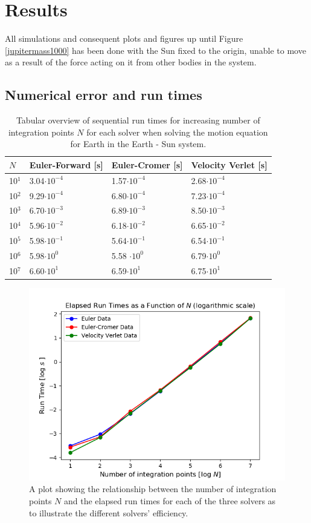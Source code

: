 \section{Results}
    All simulations and consequent plots and figures up until Figure \ref{jupitermass1000} has been done with the Sun fixed to the origin, unable to move as a result of the force acting on it from other bodies in the system.
\subsection{Numerical error and run times}
	\begin{table}[h!]
		\centering
		\caption{Tabular overview of sequential run times for increasing number of integration points $N$ for each solver when solving the motion equation for Earth in the Earth - Sun system.}
		\label{runtime}
		\begin{tabular}{l|l|l|l}
			$N$ & Euler-Forward [s] & Euler-Cromer [s] & Velocity Verlet [s]\\
			\hline
			10$^1$ &3.04$\cdot10^{-4}$ & 1.57$\cdot10^{-4}$ &2.68$\cdot10^{-4}$\\
			10$^2$ &9.29$\cdot10^{-4}$ & 6.80$\cdot10^{-4}$ &7.23$\cdot10^{-4}$ \\
			10$^3$ &6.70$\cdot10^{-3}$ & 6.89$\cdot10^{-3}$ &8.50$\cdot10^{-3}$\\
			10$^4$ &5.96$\cdot10^{-2}$ & 6.18$\cdot10^{-2}$ &6.65$\cdot10^{-2}$ \\
			10$^5$ &5.98$\cdot10^{-1}$ &5.64$\cdot10^{-1}$ &6.54$\cdot10^{-1}$ \\
			10$^6$ & 5.98$\cdot10^0$& 5.58 $\cdot10^0$&6.79$\cdot10^0$ \\
			10$^7$ &6.60$\cdot10^1$ &6.59$\cdot10^1$ &6.75$\cdot10^1$
			
		\end{tabular}
	\end{table}
	\begin{figure}[h!]
		\includegraphics[width = \linewidth]{Figure/runtimes_proj3.png}
		\caption{A plot showing the relationship between the number of integration points $N$ and the elapsed run times for each of the three solvers as to illustrate the different solvers' efficiency.}
		\label{runtimes_plot}
	\end{figure}
